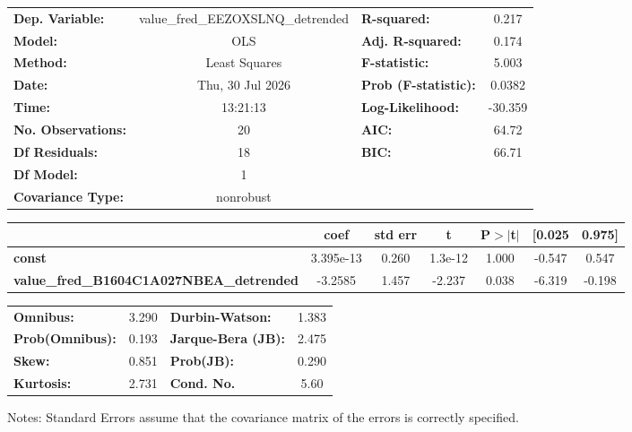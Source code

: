 \begin{center}
\begin{tabular}{lclc}
\toprule
\textbf{Dep. Variable:}                          & value\_fred\_EEZOXSLNQ\_detrended & \textbf{  R-squared:         } &     0.217   \\
\textbf{Model:}                                  &                OLS                & \textbf{  Adj. R-squared:    } &     0.174   \\
\textbf{Method:}                                 &           Least Squares           & \textbf{  F-statistic:       } &     5.003   \\
\textbf{Date:}                                   &          Thu, 30 Jul 2026         & \textbf{  Prob (F-statistic):} &   0.0382    \\
\textbf{Time:}                                   &              13:21:13             & \textbf{  Log-Likelihood:    } &   -30.359   \\
\textbf{No. Observations:}                       &                   20              & \textbf{  AIC:               } &     64.72   \\
\textbf{Df Residuals:}                           &                   18              & \textbf{  BIC:               } &     66.71   \\
\textbf{Df Model:}                               &                    1              & \textbf{                     } &             \\
\textbf{Covariance Type:}                        &             nonrobust             & \textbf{                     } &             \\
\bottomrule
\end{tabular}
\begin{tabular}{lcccccc}
                                                 & \textbf{coef} & \textbf{std err} & \textbf{t} & \textbf{P$> |$t$|$} & \textbf{[0.025} & \textbf{0.975]}  \\
\midrule
\textbf{const}                                   &    3.395e-13  &        0.260     &   1.3e-12  &         1.000        &       -0.547    &        0.547     \\
\textbf{value\_fred\_B1604C1A027NBEA\_detrended} &      -3.2585  &        1.457     &    -2.237  &         0.038        &       -6.319    &       -0.198     \\
\bottomrule
\end{tabular}
\begin{tabular}{lclc}
\textbf{Omnibus:}       &  3.290 & \textbf{  Durbin-Watson:     } &    1.383  \\
\textbf{Prob(Omnibus):} &  0.193 & \textbf{  Jarque-Bera (JB):  } &    2.475  \\
\textbf{Skew:}          &  0.851 & \textbf{  Prob(JB):          } &    0.290  \\
\textbf{Kurtosis:}      &  2.731 & \textbf{  Cond. No.          } &     5.60  \\
\bottomrule
\end{tabular}
\end{center}

Notes: \newline
 [1] Standard Errors assume that the covariance matrix of the errors is correctly specified.